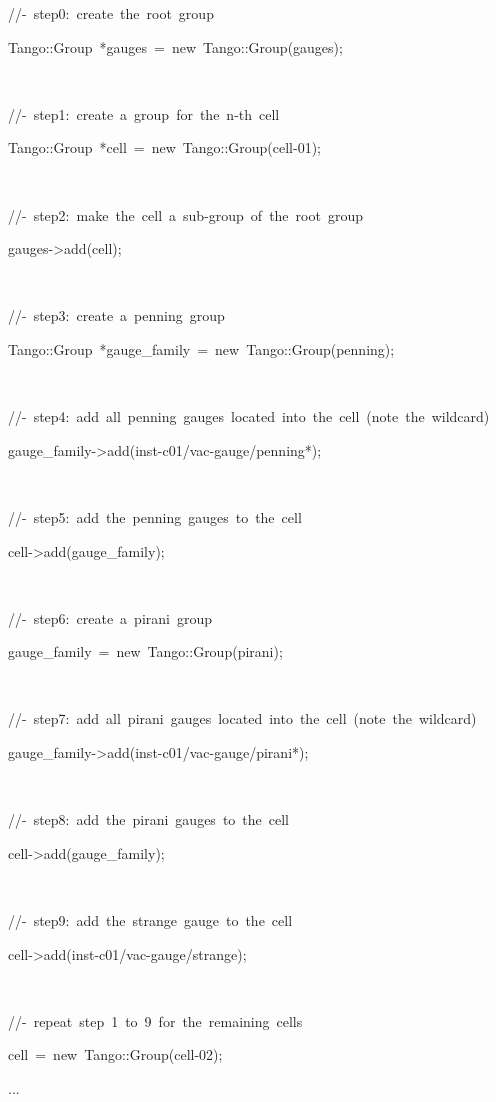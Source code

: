 
\begin{lyxcode}
//-~step0:~create~the~root~group~

Tango::Group~{*}gauges~=~new~Tango::Group(\textquotedbl{}gauges\textquotedbl{});

~



//-~step1:~create~a~group~for~the~n-th~cell

Tango::Group~{*}cell~=~new~Tango::Group(\textquotedbl{}cell-01\textquotedbl{});

~



//-~step2:~make~the~cell~a~sub-group~of~the~root~group~

gauges->add(cell);

~



//-~step3:~create~a~\textquotedbl{}penning\textquotedbl{}~group~

Tango::Group~{*}gauge\_family~=~new~Tango::Group(\textquotedbl{}penning\textquotedbl{});

~



//-~step4:~add~all~penning~gauges~located~into~the~cell~(note~the~wildcard)

gauge\_family->add(\textquotedbl{}inst-c01/vac-gauge/penning{*}\textquotedbl{});

~



//-~step5:~add~the~penning~gauges~to~the~cell

cell->add(gauge\_family);

~



//-~step6:~create~a~\textquotedbl{}pirani\textquotedbl{}~group~

gauge\_family~=~new~Tango::Group(\textquotedbl{}pirani\textquotedbl{});

~



//-~step7:~add~all~pirani~gauges~located~into~the~cell~(note~the~wildcard)

gauge\_family->add(\textquotedbl{}inst-c01/vac-gauge/pirani{*}\textquotedbl{});

~



//-~step8:~add~the~pirani~gauges~to~the~cell

cell->add(gauge\_family);

~



//-~step9:~add~the~\textquotedbl{}strange\textquotedbl{}~gauge~to~the~cell

cell->add(\textquotedbl{}inst-c01/vac-gauge/strange\textquotedbl{});

~



//-~repeat~step~1~to~9~for~the~remaining~cells

cell~=~new~Tango::Group(\textquotedbl{}cell-02\textquotedbl{});

...
\end{lyxcode}
 


